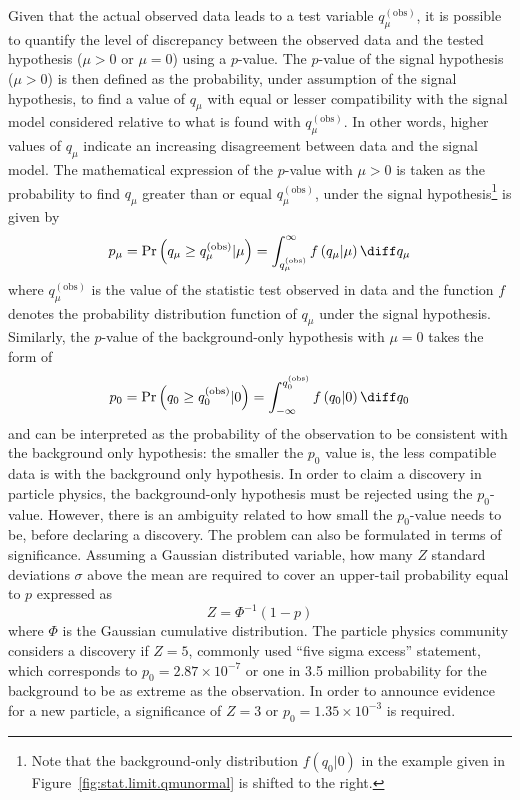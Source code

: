 Given that the actual observed data leads to a test variable $q_{\mu}^{\left(\text{obs}\right)}$, it is possible to 
quantify the level of discrepancy between the observed data and the tested hypothesis ($\mu>0$ or $\mu=0$) using 
a $p$-value. 
The $p$-value of the signal hypothesis ($\mu>0$) is then defined as the probability, under assumption of the signal hypothesis, 
to find a value of $q_{\mu}$ with equal or lesser compatibility with the signal model considered relative to what is 
found with $q_{\mu}^{\left(\text{obs}\right)}$. In other words,  higher values of $q_{\mu}$ indicate an increasing disagreement
between data and the signal model. The mathematical expression of the $p$-value with $\mu>0$ is taken as the probability 
to find $q_{\mu}$ greater than or equal $q_{\mu}^{\left(\text{obs}\right)}$, under the signal hypothesis\footnote{Note that 
 the background-only distribution $f\left(q_{0} \rvert 0\right)$ in the example given in 
Figure~\ref{fig:stat.limit.qmunormal} is shifted to the right.} is given by
\begin{equation}
p_{\mu} = \Pr\left(q_{\mu} \geq q_{\mu}^{\left(\text{obs}\right)} \rvert \mu \right) = \int_{q_{\mu}^{\left(\text{obs}\right)}}^{\infty} f\left(q_{\mu} \rvert \mu\right) \diff q_{\mu}
\end{equation}
where $q_{\mu}^{\left(\text{obs}\right)}$ is the value of the statistic test observed in data and the function $f$
denotes the probability distribution function of $q_{\mu}$ under the signal hypothesis. 
Similarly, the $p$-value of the background-only hypothesis with $\mu=0$ takes the form of 
\begin{equation}
p_{0} = \Pr\left(q_{0} \geq q_{0}^{\left(\text{obs}\right)} \rvert 0 \right) = \int^{q_{0}^{\left(\text{obs}\right)}}_{-\infty} f\left(q_{0} \rvert 0\right) \diff q_{0}
\end{equation}
and can be interpreted as the probability of the observation to be consistent with the background only hypothesis:
the smaller the $p_{0}$ value is, the less compatible data is with the background only hypothesis. 
In order to claim a discovery in particle physics, 
the background-only hypothesis must be rejected using the $p_0$-value. 
However, there is an ambiguity related to how small the $p_0$-value needs to 
be, before declaring a discovery. 
The problem can also be formulated in terms of significance.
Assuming a Gaussian distributed variable, how many $Z$ standard deviations 
$\sigma$ above the mean are required to cover an upper-tail probability equal 
to $p$ expressed as 
\begin{equation}
Z = \Phi^{-1}\left(1-p\right)
\end{equation}
 where $\Phi$ is the Gaussian cumulative distribution.
The particle physics community considers a discovery if $Z=5$, commonly 
used ``five sigma excess'' statement, which corresponds to 
$p_0 = 2.87\times 10^{-7}$ or one in 3.5 million probability for the background
 to be as extreme as the observation. In order to announce evidence for a 
new particle, a significance of $Z=3$ or $p_0 = 1.35\times 10^{-3}$ is required.


